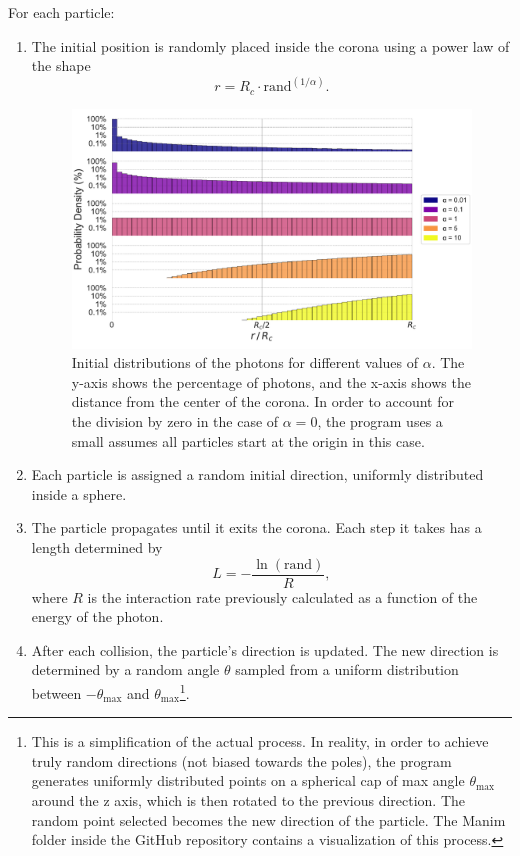 For each particle:
\begin{enumerate}
\item The initial position is randomly placed inside the corona using a power law of the shape
\begin{equation}
r = R_c \cdot \text{rand}^{(1/\alpha)}.
\label{eq:alpha}
\end{equation}
\begin{figure}[ht]
    \includegraphics[width=\textwidth]{Figures/InitialDistributions.pdf}
    \centering
    \caption{Initial distributions of the photons for different values of $\alpha$. The y-axis shows the percentage of photons, and the x-axis shows the distance from the center of the corona. In order to account for the division by zero in the case of $\alpha=0$, the program uses a small assumes all particles start at the origin in this case.}
    \label{fig:initial_distributions}
\end{figure}

\item Each particle is assigned a random initial direction, uniformly distributed inside a sphere.
\item The particle propagates until it exits the corona. Each step it takes has a length determined by
\begin{equation}
L = -\frac{\ln (\text{rand})}{R},
\end{equation}
where $R$ is the interaction rate previously calculated as a function of the energy of the photon.
\item After each collision, the particle's direction is updated. The new direction is determined by a random angle $\theta$ sampled from a uniform distribution between $-\theta_{\max}$ and $\theta_{\max}$\footnote{This is a simplification of the actual process. In reality, in order to achieve truly random directions (not biased towards the poles), the program generates uniformly distributed points on a spherical cap of max angle $\theta_{\max}$ around the z axis, which is then rotated to the previous direction. The random point selected becomes the new direction of the particle. The Manim folder inside the GitHub repository contains a visualization of this process.}.


\end{enumerate}
